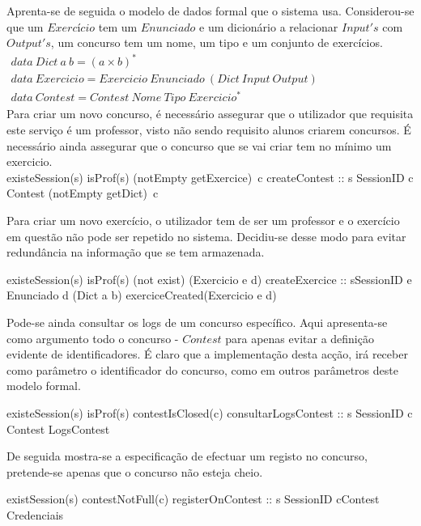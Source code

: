 Aprenta-se de seguida o modelo de dados formal que o sistema usa. Considerou-se que um $Exercício$ tem um $Enunciado$ e um dicionário a relacionar $Input's$ com $Output's$,
um concurso tem um nome, um tipo e um conjunto de exercícios.\\

$\begin{array}{l}
data~Dict~a~b = (a \times b)^{*} \\
data~Exercicio = Exercicio~Enunciado~(Dict~Input~Output) \\
data~Contest =  Contest~Nome~Tipo~Exercicio^{*}
\end{array}$\\

Para criar um novo concurso, é necessário assegurar que o utilizador que requisita este serviço é um professor, visto não sendo requisito alunos criarem concursos.
É necessário ainda assegurar que o concurso que se vai criar tem no mínimo um exercicio.\\

\prop
{ existeSession(s)  \wedge isProf(s) \wedge (notEmpty \circ getExercice)~c}
{createContest :: s \unif SessionID \rarrow c \unif Contest }
{ (notEmpty \circ getDict)~c }

Para criar um novo exercício, o utilizador tem de ser um professor e o exercício em questão não pode ser repetido no sistema. Decidiu-se desse modo para evitar redundância
na informação que se tem armazenada.

\prop
{ existeSession(s)  \wedge isProf(s) \wedge (not \circ exist) (Exercicio e d)}
{createExercice :: s\unif SessionID \rarrow e \unif Enunciado \rarrow d \unif (Dict a b) }
{ exerciceCreated(Exercicio e d) }

Pode-se ainda consultar os logs de um concurso específico. Aqui apresenta-se como argumento todo o concurso - $Contest$ para apenas evitar a definição evidente
de identificadores. É claro que a implementação desta acção, irá receber como parâmetro o identificador do concurso, como em outros parâmetros deste modelo formal.

\prop 
{ existeSession(s) \wedge isProf(s) \wedge contestIsClosed(c) }
{consultarLogsContest :: s \unif SessionID \rarrow c \unif Contest \rarrow LogsContest}
{}

De seguida mostra-se a especificação de efectuar um registo no concurso, pretende-se apenas que o concurso não esteja cheio.

\prop
{ existSession(s) \wedge contestNotFull(c)}
{registerOnContest :: s \unif SessionID \rarrow c\unif Contest \rarrow Credenciais}
{ }

